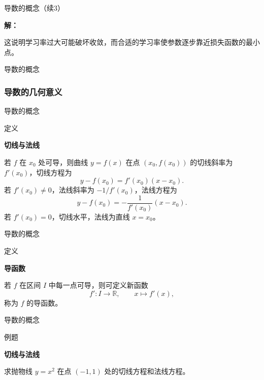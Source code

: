 \documentclass[aspectratio=169,10pt,fontset=fandol]{ctexbeamer}
\renewenvironment{solution}{\par\noindent\textbf{解：}\quad}{\par}
\newcommand{\RR}{\mathbb{R}}
\begin{document}
\begin{frame}[t,fragile]{导数的概念（续3）}
\footnotesize
{\footnotesize
\begin{application}[导数与梯度下降的基本思想]
	\begin{solution}
		
 这说明学习率过大可能破坏收敛，而合适的学习率使参数逐步靠近损失函数的最小点。
	\end{solution}
	
\end{application}
}
\end{frame}
\begin{frame}[t,fragile]{导数的概念}
\footnotesize
{\footnotesize

\subsubsection*{导数的几何意义}


}
\end{frame}
\begin{frame}[t,fragile]{导数的概念}
\footnotesize
\begin{block}{定义}
{\footnotesize
\textbf{切线与法线}\par

若 $f$ 在 $x_0$ 处可导，则曲线 $y=f(x)$ 在点 $(x_0,f(x_0))$ 的切线斜率为 $f'(x_0)$，切线方程为
\[
y-f(x_0)=f'(x_0)(x-x_0).
\]
若 $f'(x_0)\neq0$，法线斜率为 $-1/f'(x_0)$，法线方程为
\[
y-f(x_0)=-\frac{1}{f'(x_0)}(x-x_0).
\]
若 $f'(x_0)=0$，切线水平，法线为直线 $x=x_0$。

}
\end{block}
\end{frame}
\begin{frame}[t,fragile]{导数的概念}
\footnotesize
\begin{block}{定义}
{\footnotesize
\textbf{导函数}\par

若 $f$ 在区间 $I$ 中每一点可导，则可定义新函数
\[
f':I\to\RR,\qquad x\mapsto f'(x),
\]
称为 $f$ 的导函数。

}
\end{block}
\end{frame}
\begin{frame}[t,fragile]{导数的概念}
\footnotesize
\begin{block}{例题}
{\footnotesize
\textbf{切线与法线}\par

求抛物线 $y=x^2$ 在点 $(-1,1)$ 处的切线方程和法线方程。

}
\end{block}
\end{frame}
\end{document}
